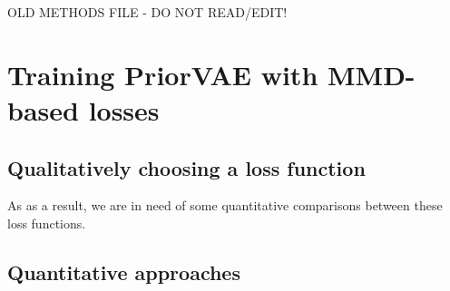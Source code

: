 
OLD METHODS FILE - DO NOT READ/EDIT!


\section{Training PriorVAE with MMD-based losses}\label{sec:priorvae+mmd}

\subsection{Qualitatively choosing a loss function}\label{subsec:qual}

As as a result, we are in need of some quantitative comparisons between these loss functions. 

\subsection{Quantitative approaches}\label{subsec:quant}



